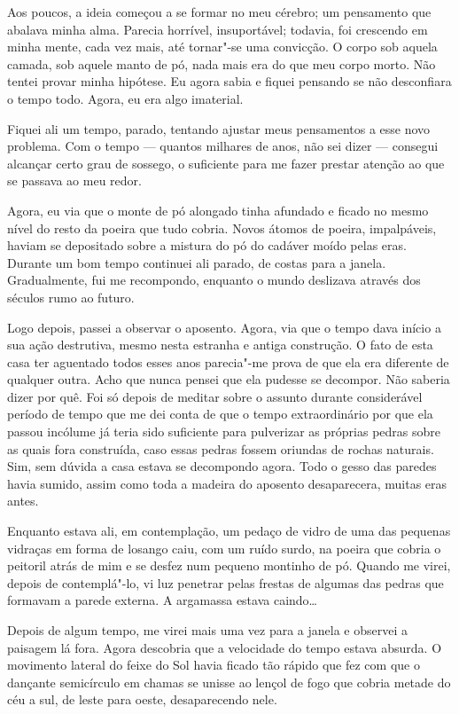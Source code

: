 Aos poucos, a ideia começou a se formar no meu cérebro; um pensamento que abalava minha alma. Parecia horrível,
insuportável; todavia, foi crescendo em minha mente, cada vez mais, até tornar"-se uma convicção. O corpo sob aquela
camada, sob aquele manto de pó, nada mais era do que meu corpo morto. Não tentei provar minha hipótese. Eu
agora sabia e fiquei pensando se não desconfiara o tempo todo. Agora, eu era algo imaterial.

Fiquei ali um tempo, parado, tentando ajustar meus pensamentos a esse novo problema. Com o tempo --- quantos milhares de
anos, não sei dizer --- consegui alcançar certo grau de sossego, o suficiente para me fazer prestar atenção ao que se
passava ao meu redor.

Agora, eu via que o monte de pó alongado tinha afundado e ficado no mesmo nível do resto da poeira que tudo cobria.
Novos átomos de poeira, impalpáveis, haviam se depositado sobre a mistura do pó do cadáver moído pelas eras. Durante um
bom tempo continuei ali parado, de costas para a janela. Gradualmente, fui me recompondo, enquanto o mundo deslizava
através dos séculos rumo ao futuro.

Logo depois, passei a observar o aposento. Agora, via que o tempo dava início a sua ação destrutiva, mesmo nesta
estranha e antiga construção. O fato de esta casa ter aguentado todos esses anos parecia"-me prova de que ela era
diferente de qualquer outra. Acho que nunca pensei que ela pudesse se decompor. Não saberia dizer por quê. Foi só
depois de meditar sobre o assunto durante considerável período de tempo que me dei conta de que o tempo
extraordinário por que ela passou incólume já teria sido suficiente para pulverizar as próprias pedras sobre as quais
fora construída, caso essas pedras fossem oriundas de rochas naturais. Sim, sem dúvida a casa estava se decompondo agora.
Todo o gesso das paredes havia sumido, assim como toda a madeira do aposento desaparecera, muitas eras antes.

Enquanto estava ali, em contemplação, um pedaço de vidro de uma das pequenas vidraças em forma de losango caiu, com um
ruído surdo, na poeira que cobria o peitoril atrás de mim e se desfez num pequeno montinho de pó. Quando me virei,
depois de contemplá"-lo, vi luz penetrar pelas frestas de algumas das pedras que formavam a parede externa.
A argamassa estava caindo\ldots{}

Depois de algum tempo, me virei mais uma vez para a janela e observei a paisagem lá fora. Agora descobria que a velocidade
do tempo estava absurda. O movimento lateral do feixe do Sol havia ficado tão rápido que fez com que o dançante
semicírculo em chamas se unisse ao lençol de fogo que cobria metade do céu a sul, de leste para oeste, desaparecendo
nele. 

